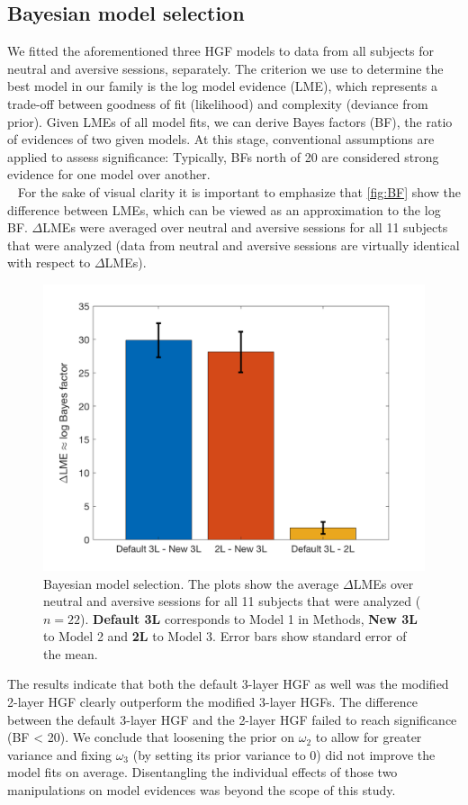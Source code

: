 \documentclass{article}
\begin{document}
\begin{multicols}{2}
\vspace{-0.5cm}
\subsection*{Bayesian model selection}
We fitted the aforementioned three HGF models to data from all subjects for neutral and aversive sessions, separately. The criterion we use to determine the best model in our family is the \textsf{log model evidence (LME)}, which represents a trade-off between goodness of fit (likelihood) and complexity (deviance from prior). Given LMEs of all model fits, we can derive \textsf{Bayes factors (BF)}, the ratio of evidences of two given models. At this stage, conventional assumptions are applied to assess significance: Typically, BFs north of 20 are considered strong evidence for one model over another. \\ 
For the sake of visual clarity it is important to emphasize that \autoref{fig:BF} show the difference between LMEs, which can be viewed as an approximation to the log BF. $\Delta$LMEs were averaged over neutral and aversive sessions for all 11 subjects that were analyzed (data from neutral and aversive sessions are virtually identical with respect to $\Delta$LMEs). 

\begin{figure}[H]
  \centering
  \includegraphics[width=.48\textwidth]{deltaLMEs_final.png}
  \caption{Bayesian model selection. The plots show the average $\Delta$LMEs over neutral and aversive sessions for all 11 subjects that were analyzed ($n = 22$). \textbf{Default 3L} corresponds to Model 1 in \textsf{Methods}, \textbf{New 3L} to Model 2 and \textbf{2L} to Model 3. Error bars show standard error of the mean.}
  \label{fig:BF}
\end{figure}
\vfill\null
\columnbreak

The results indicate that both the default 3-layer HGF as well was the modified 2-layer HGF clearly outperform the modified 3-layer HGFs. The difference between the default 3-layer HGF and the 2-layer HGF failed to reach significance (BF < 20). We conclude that loosening the prior on $\omega_2$ to allow for greater variance and fixing $\omega_3$ (by setting its prior variance to 0) did not improve the model fits on average. Disentangling the individual effects of those two manipulations on model evidences was beyond the scope of this study. \\



\end{multicols}
\end{document}
